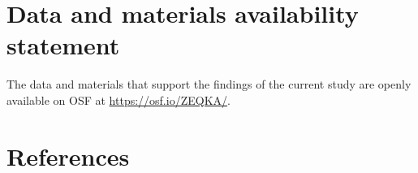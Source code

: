 \documentclass[
  man,floatsintext]{apa6}
\begin{document}
\newpage

\hypertarget{data-and-materials-availability-statement}{%
\section{Data and materials availability statement}\label{data-and-materials-availability-statement}}

The data and materials that support the findings of the current study are openly available on OSF at \url{https://osf.io/ZEQKA/}.

\newpage

\hypertarget{references}{%
\section{References}\label{references}}

\begingroup
\setlength{\parindent}{-0.5in}
\setlength{\leftskip}{0.5in}
\end{document}
